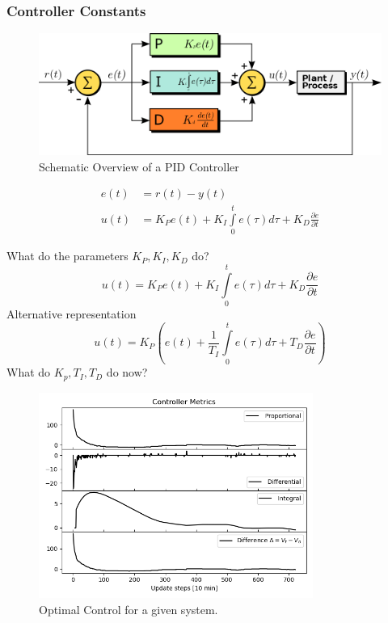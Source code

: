 \subsubsection{Controller Constants}
\label{subsec:concepts-controller-constant-discussion}
\begin{frame}{\insertsubsubsection}
	\begin{figure}
		\centering
		\includegraphics[width=\textwidth]{media/PID_en}
		\caption{Schematic Overview of a PID Controller~\cite{wikiPID2011}}
	\end{figure}
	\begin{align}
		e(t) &= r(t) - y(t)\\
		u(t) &= K_P e(t) + K_I \int\limits^t_0 e(\tau)d\tau + K_D \frac{\partial e}{\partial t}
	\end{align}
\end{frame}
%
%
\begin{frame}{\insertsubsubsection}
	What do the parameters $K_P, K_I, K_D$ do?
	\begin{equation}
		u(t) = K_P e(t) + K_I \int\limits^t_0 e(\tau)d\tau + K_D \frac{\partial e}{\partial t}
	\end{equation}
	Alternative representation
	\begin{equation}
		u(t) = K_P \left(e(t) + \frac{1}{T_I}\int\limits^t_0 e(\tau)d\tau + T_D\frac{\partial e}{\partial t}\right)
	\end{equation}
	What do $K_p,T_I,T_D$ do now?
\end{frame}
%
%
\begin{frame}{\insertsubsubsection}
	\begin{figure}
		\centering
		\includegraphics[width=0.8\textwidth]{media/UkrainianFlagControllerMetrics}
		\caption{Optimal Control for a given system.}
	\end{figure}
\end{frame}
